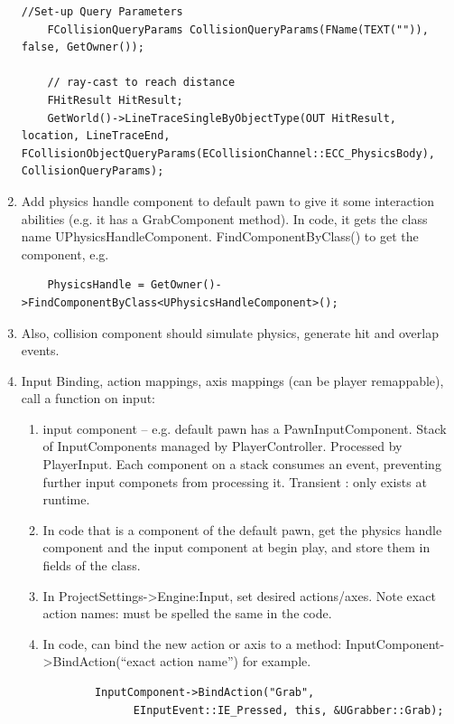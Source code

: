 \documentclass[letter,12pt]{article}
\begin{document}
\begin{enumerate}
\begin{verbatim}
//Set-up Query Parameters
	FCollisionQueryParams CollisionQueryParams(FName(TEXT("")), false, GetOwner());

	// ray-cast to reach distance
	FHitResult HitResult;
	GetWorld()->LineTraceSingleByObjectType(OUT HitResult, location, LineTraceEnd, FCollisionObjectQueryParams(ECollisionChannel::ECC_PhysicsBody), CollisionQueryParams);
\end{verbatim}

\item Add physics handle component to default pawn to give it some interaction abilities (e.g. it has a GrabComponent method).  In code, it gets the class name 	UPhysicsHandleComponent. FindComponentByClass() to get the component, e.g.
\begin{verbatim}
	PhysicsHandle = GetOwner()->FindComponentByClass<UPhysicsHandleComponent>();
\end{verbatim}
\item Also, collision component should simulate physics, generate hit and overlap events.

\item Input Binding, action mappings, axis mappings (can be player remappable), call a function on input:
\begin{enumerate}
\item input component -- e.g. default pawn has a PawnInputComponent.  Stack of InputComponents managed by PlayerController.  Processed by PlayerInput.   Each component on a stack consumes an event, preventing further input componets from processing it.  Transient : only exists at runtime.

\item In code that is a component of the default pawn, get the physics handle component and the input component at begin play, and store them in fields of the class.

\item In ProjectSettings->Engine:Input, set desired actions/axes.  Note exact action names: must be spelled the same in the code.

\item In code, can bind the new action or axis to a method: InputComponent->BindAction(“exact action name”) for example.

\begin{verbatim}
		InputComponent->BindAction("Grab", 
		      EInputEvent::IE_Pressed, this, &UGrabber::Grab);
\end{verbatim}


\end{enumerate}
\end{enumerate}
\end{document}
